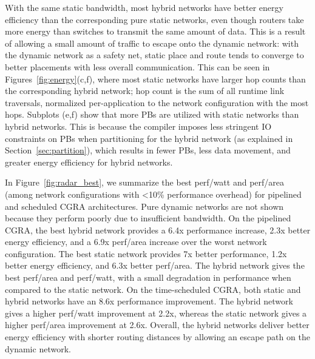 With the same static bandwidth, most hybrid networks have better energy efficiency than the corresponding pure static networks, even though routers take more energy than switches to transmit the same amount of data.
This is a result of allowing a small amount of traffic to escape onto the dynamic network: with the dynamic network as a safety net, static place and route tends to converge to better placements with less overall communication.
This can be seen in Figures~\ref{fig:energy}(c,f), where most static networks have larger hop counts than the corresponding hybrid network; hop count is the sum of all runtime link traversals, normalized per-application to the network configuration with the most hops.
Subplots (e,f) show that more PBs are utilized with static networks than hybrid networks.
This is because the compiler imposes less stringent IO constraints on PBs when partitioning for the hybrid network (as explained in Section~\ref{sec:partition}), which results in fewer PBs, less data movement, and greater energy efficiency for hybrid networks.

In Figure~\ref{fig:radar_best}, we summarize the best perf/watt and perf/area (among network configurations with <10\% performance overhead) for pipelined and scheduled CGRA architectures. 
Pure dynamic networks are not shown because they perform poorly due to insufficient bandwidth.
On the pipelined CGRA, the best hybrid network provides a 6.4x performance increase, 2.3x better energy efficiency, and a 6.9x perf/area increase over the worst network configuration. 
The best static network provides 7x better performance, 1.2x better energy efficiency, and 6.3x better perf/area. 
The hybrid network gives the best perf/area and perf/watt, with a small degradation in performance when compared to the static network. 
On the time-scheduled CGRA, both static and hybrid networks have an 8.6x performance improvement. 
The hybrid network gives a higher perf/watt improvement at 2.2x, whereas the static network gives a higher perf/area improvement at 2.6x.
Overall, the hybrid networks deliver better energy efficiency with shorter routing distances by allowing an escape path on the dynamic network.



